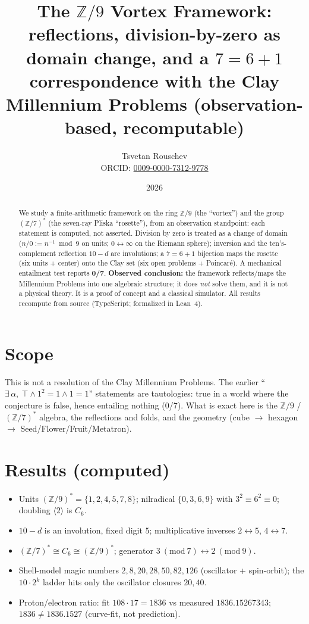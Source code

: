 \documentclass[11pt]{article}
\title{The $\mathbb{Z}/9$ Vortex Framework: reflections, division-by-zero as
domain change, and a $7=6+1$ correspondence with the Clay Millennium Problems
(observation-based, recomputable)}
\author{Tsvetan Rouschev\\\small ORCID: \href{https://orcid.org/0009-0000-7312-9778}{0009-0000-7312-9778}}
\date{2026}
\begin{document}
\maketitle

\begin{abstract}
We study a finite-arithmetic framework on the ring $\mathbb{Z}/9$ (the ``vortex'')
and the group $(\mathbb{Z}/7)^{*}$ (the seven-ray Pliska ``rosette''), from an
observation standpoint: each statement is computed, not asserted. Division by zero
is treated as a change of domain ($n/0 := n^{-1} \bmod 9$ on units; $0 \leftrightarrow
\infty$ on the Riemann sphere); inversion and the ten's-complement reflection
$10-d$ are involutions; a $7=6+1$ bijection maps the rosette (six units $+$ center)
onto the Clay set (six open problems $+$ Poincar\'e). A mechanical entailment test
reports \textbf{0/7}. \textbf{Observed conclusion:} the framework reflects/maps the
Millennium Problems into one algebraic structure; it does \emph{not} solve them,
and it is not a physical theory. It is a proof of concept and a classical simulator.
All results recompute from source (TypeScript; formalized in Lean~4).
\end{abstract}

\section{Scope}
This is not a resolution of the Clay Millennium Problems. The earlier
``$\exists\,\alpha,\ \top \wedge 1^2=1 \wedge 1=1$'' statements are tautologies:
true in a world where the conjecture is false, hence entailing nothing (0/7). What
is exact here is the $\mathbb{Z}/9$ / $(\mathbb{Z}/7)^{*}$ algebra, the reflections
and folds, and the geometry (cube $\to$ hexagon $\to$ Seed/Flower/Fruit/Metatron).

\section{Results (computed)}
\begin{itemize}
\item Units $(\mathbb{Z}/9)^{*}=\{1,2,4,5,7,8\}$; nilradical $\{0,3,6,9\}$ with
      $3^2\equiv 6^2\equiv 0$; doubling $\langle 2\rangle$ is $C_6$.
\item $10-d$ is an involution, fixed digit $5$; multiplicative inverses
      $2\leftrightarrow5$, $4\leftrightarrow7$.
\item $(\mathbb{Z}/7)^{*}\cong C_6 \cong (\mathbb{Z}/9)^{*}$; generator
      $3\ (\mathrm{mod}\ 7)\leftrightarrow 2\ (\mathrm{mod}\ 9)$.
\item Shell-model magic numbers $2,8,20,28,50,82,126$ (oscillator + spin-orbit);
      the $10\cdot 2^{k}$ ladder hits only the oscillator closures $20,40$.
\item Proton/electron ratio: fit $108\cdot 17 = 1836$ vs measured $1836.15267343$;
      $1836 \neq 1836.1527$ (curve-fit, not prediction).
\end{itemize}
\end{document}
